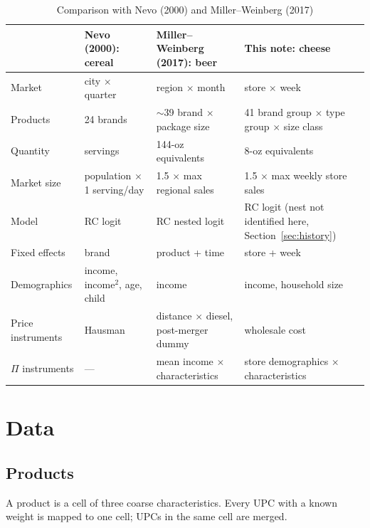 \documentclass[11pt]{article}
\begin{document}
\begin{table}[htbp]
\centering
\small
\caption{Comparison with Nevo (2000) and Miller--Weinberg (2017)}\label{tab:mapping}
\begin{tabularx}{\textwidth}{@{}lLLL@{}}
\toprule
 & Nevo (2000): cereal & Miller--Weinberg (2017): beer & This note: cheese \\
\midrule
Market & city $\times$ quarter & region $\times$ month & store $\times$ week \\
Products & 24 brands & $\sim$39 brand $\times$ package size & 41 brand group $\times$ type group
           $\times$ size class \\
Quantity & servings & 144-oz equivalents & 8-oz equivalents \\
Market size & population $\times$ 1 serving/day & 1.5 $\times$ max regional sales & 1.5
              $\times$ max weekly store sales \\
Model & RC logit & RC nested logit & RC logit (nest not identified here,
        Section~\ref{sec:history}) \\
Fixed effects & brand & product + time & store + week \\
Demographics & income, income$^2$, age, child & income & income, household size \\
Price instruments & Hausman & distance $\times$ diesel, post-merger dummy & wholesale cost \\
$\Pi$ instruments & --- & mean income $\times$ characteristics & store demographics $\times$
                    characteristics \\
\bottomrule
\end{tabularx}
\end{table}

\section{Data}\label{sec:data}

\subsection{Products}\label{sec:products}

A product is a cell of three coarse characteristics. Every UPC with a known weight is mapped to
one cell; UPCs in the same cell are merged.
\end{document}
